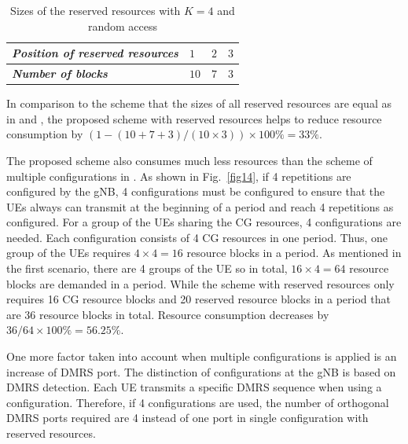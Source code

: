 \documentclass{ieeeaccess}
\begin{document}



\begin{table}[htbp]
\caption{Sizes of the reserved resources with $K=4$ and random access}
\begin{center}
\begin{tabular}{|p{10em}|p{2em}|p{2em}|p{2em}|}
 \hline
 \textbf{\textit{Position of reserved resources}} & $1$ &$2$ &$3$ \\ 
 \hline
 \textbf{\textit{Number of blocks}} & $10$ &$7$ &$3$ \\

 
 \hline
\end{tabular}
\label{tab3}
\vspace{-2mm}
\end{center}

\end{table}

In comparison to the scheme that the sizes of all reserved resources are equal as in \cite{ref10} and \cite{ref11}, the proposed scheme with reserved resources helps to reduce resource consumption by $(1 - (10+7+3)/(10\times3))\times100\% = 33\%$.

The proposed scheme also consumes much less resources than the scheme of multiple configurations in  \cite{ref7}. As shown in Fig.~\ref{fig14}, if 4 repetitions are configured by the gNB, 4 configurations must be configured to ensure that the UEs always can transmit at the beginning of a period and reach 4 repetitions as configured. For a group of the UEs sharing the CG resources, 4 configurations are needed. Each configuration consists of 4 CG resources in one period. Thus, one group of the UEs requires $4\times4 = 16$ resource blocks in a period. As mentioned in the first scenario, there are 4 groups of the UE so in total, $16\times4 = 64$ resource blocks are demanded in a period. While the scheme with reserved resources only requires 16 CG resource blocks and 20 reserved resource blocks in a period that are 36 resource blocks in total. Resource consumption decreases by $36/64\times100\% = 56.25\%$.

One more factor taken into account when multiple configurations is applied is an increase of DMRS port. The distinction of configurations at the gNB is based on DMRS detection. Each UE transmits a specific DMRS sequence when using a configuration. Therefore, if 4 configurations are used, the number of orthogonal DMRS ports required are 4 instead of one port in single configuration with reserved resources.
\end{document}
